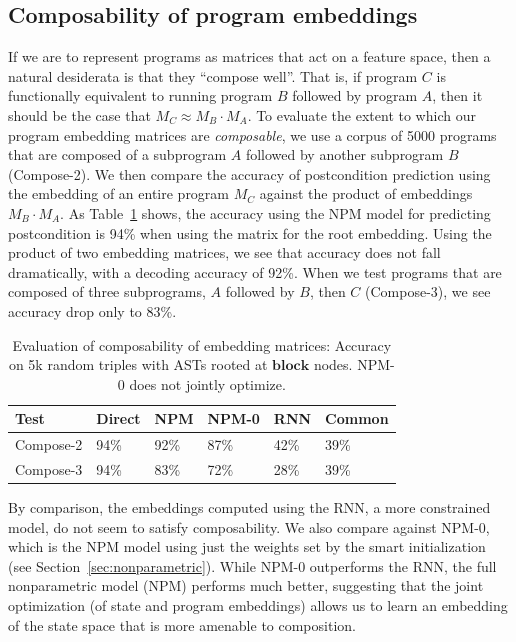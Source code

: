 \subsection{Composability of program embeddings}
If we are to represent programs as matrices that act on
a feature space, then a natural desiderata is that they ``compose
well''.  That is, if program $C$ is functionally equivalent
to running program $B$ followed by program $A$, then it should
be the case that $M_C \approx M_B\cdot M_A$.  To evaluate the extent
to which our program embedding matrices are \emph{composable},
we use a corpus of 5000 programs that are composed of a subprogram $A$ followed by another subprogram $B$ (Compose-2). 
We then compare the accuracy of postcondition prediction
using the embedding of an entire program $M_C$ against the
product of embeddings $M_B\cdot M_A$.  
As Table~\ref{tab:results2} shows,
the accuracy using the NPM model for predicting  postcondition is 94\% when using the matrix for the root embedding.  Using the product of two embedding matrices, we see that accuracy does not fall dramatically, with a decoding accuracy of 92\%.
When we test programs that are composed of three subprograms, $A$ followed by $B$, then $C$ (Compose-3), we see 
accuracy drop only to 83\%. 



\begin{table}[t]
  \centering
  \begin{tabular}{@{}llllll}
     \toprule
     
         Test & Direct & NPM & NPM-0 & RNN & Common \\
          \midrule
    Compose-2 & 94\% & 92\% & 87\% & 42\% & 39\%\\
Compose-3 & 94\% & 83\% & 72\% & 28\% & 39\%\\
    \bottomrule
  \end{tabular}
  \caption[Postcondition prediction composability]{Evaluation of composability of  embedding matrices: Accuracy on 5k random triples with ASTs rooted at $\mathbf{block}$ nodes. NPM-0 does not jointly optimize. }
  \label{tab:results2}
\end{table}

By comparison, the embeddings computed using the 
RNN, a more constrained model, do not seem to satisfy
composability.  We also compare against NPM-0, which is the 
NPM model using just the weights set
by the smart initialization (see Section~\ref{sec:nonparametric}).  While NPM-0 outperforms the RNN,
the full nonparametric model (NPM) performs much better,
suggesting that the joint optimization (of state and program 
embeddings) allows us to learn
an embedding of the state space that is more amenable to composition.


